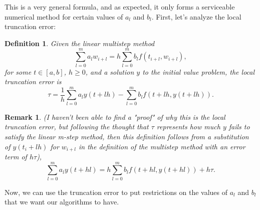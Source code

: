 \documentclass{article}
\newtheorem{definition}{Definition}[section]
\newtheorem{remark}{Remark}[section]
\newcommand{\0}{\vb{0}}
\begin{document}
This is a very general formula, and as expected, it only forms a serviceable numerical method for certain values of $a_l$ and $b_l$. First, let's analyze the local truncation error:

\begin{definition}
  Given the linear multistep method
  \[\sum_{l=0}^ma_lw_{i+l} = h\sum_{l=0}^mb_lf(t_{i+l}, w_{i+l}),\]
  for some $t \in [a, b]$, $h \geq 0$, and a solution $y$ to the initial value problem, the local truncation error is
  \[\tau = \frac{1}{h}\sum_{l=0}^ma_ly(t + lh) - \sum_{l=0}^mb_lf(t+lh, y(t+lh)).\]
\end{definition}

\begin{remark}
(I haven't been able to find a "proof" of why this is the local truncation error, but following the thought that $\tau$ represents how much $y$ fails to satisfy the linear m-step method, then this definition follows from a substitution of $y(t_i + lh)$ for $w_{i+l}$ in the definition of the multistep method with an error term of $h\tau$),
  \[\sum_{l=0}^ma_ly(t + hl) = h\sum_{l=0}^mb_lf(t+hl, y(t + hl)) + h\tau.\]
\end{remark}

Now, we can use the truncation error to put restrictions on the values of $a_l$ and $b_l$ that we want our algorithms to have.
\end{document}
